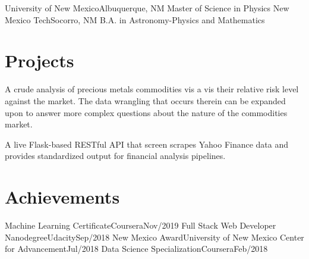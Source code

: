 \SubHeadingListBegin

    \Education
        {University of New Mexico}{Albuquerque, NM}
        {Master of Science in Physics}{}
    \Education
        {New Mexico Tech}{Socorro, NM}
        {B.A. in Astronomy-Physics and Mathematics}{}

\SubHeadingListEnd


\section{Projects}

\SubHeadingListBegin

        {A crude analysis of precious metals commodities vis a vis their relative risk level against the market. The data wrangling that occurs therein can be expanded upon to answer more complex questions about the nature of the commodities market.}

        {A live Flask-based RESTful API that screen scrapes Yahoo Finance data and provides standardized output for financial analysis pipelines.}

\SubHeadingListEnd

\section{Achievements}

\SubHeadingListBegin

    \Achievement
        {Machine Learning Certiﬁcate}{Coursera}{Nov/2019}
    \Achievement
        {Full Stack Web Developer Nanodegree}{Udacity}{Sep/2018}
    \Achievement
        {New Mexico Award}{University of New Mexico Center for Advancement}{Jul/2018}
    \Achievement
        {Data Science Specialization}{Coursera}{Feb/2018}

\SubHeadingListEnd




